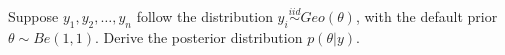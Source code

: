   \item Suppose $y_1, y_2, \ldots, y_n$ follow the distribution $y_i\stackrel{iid}{\sim}Geo(\theta)$, with the default prior $\theta \sim Be(1,1)$. Derive the posterior distribution $p(\theta | y)$.

    \ansfont{

    }

